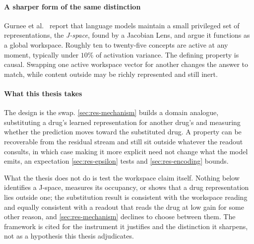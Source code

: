\paragraph{A sharper form of the same distinction} Gurnee et al.~\cite{workspace}
report that language models maintain a small privileged set of representations,
the \emph{J-space}, found by a Jacobian Lens, and argue it functions as a global
workspace. Roughly ten to twenty-five concepts are active at any moment,
typically under $10\%$ of activation variance. The defining property is causal.
Swapping one active
workspace vector for another changes the answer to match, while content outside
may be richly represented and still inert.

\paragraph{What this thesis takes} The design is the swap.
\cref{sec:res-mechanism} builds a domain analogue, substituting a drug's learned
representation for another drug's and measuring whether the prediction moves
toward the substituted drug. A property can be recoverable from the residual
stream and still sit outside whatever the readout consults, in which case making
it more explicit need not change what the model emits, an expectation
\cref{sec:res-epsilon} tests and \cref{sec:res-encoding} bounds.

%
\begin{scopelimit}
What the thesis does not do is test the workspace claim itself. Nothing below
identifies a J-space, measures its occupancy, or shows that a drug
representation lies outside one; the substitution result is consistent with the
workspace reading and equally consistent with a readout that reads the drug at
low gain for some other reason, and \cref{sec:res-mechanism} declines to choose
between them. The framework is cited for the instrument it justifies and the
distinction it sharpens, not as a hypothesis this thesis adjudicates.
\end{scopelimit}

